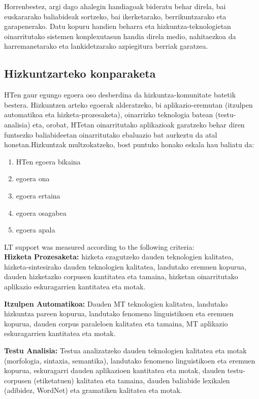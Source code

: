 \begin{multicols}{2}
Horrenbestez, argi dago ahalegin handiagoak bideratu behar direla, bai euskararako baliabideak sortzeko, bai ikerketarako, berrikuntzarako eta garapenerako. Datu kopuru handien beharra eta hizkuntza-teknologietan oinarritutako sistemen konplexutasun handia direla medio, nahitaezkoa da harremanetarako eta lankidetzarako azpiegitura berriak garatzea.

\subsection{Hizkuntzarteko konparaketa}
    HTen gaur egungo egoera oso desberdina da hizkuntza-komunitate batetik bestera. Hizkuntzen arteko egoerak alderatzeko, bi aplikazio-eremutan (itzulpen automatikoa eta hizketa-prozesaketa), oinarrizko teknologia batean (testu-analisia) eta, orobat, HTetan oinarritutako aplikazioak garatzeko behar diren funtsezko baliabideetan oinarritutako ebaluazio bat aurkeztu da atal honetan.Hizkuntzak multzokatzeko, bost puntuko honako eskala hau baliatu da:

\begin{enumerate}
\item HTen egoera bikaina
\item egoera ona
\item egoera ertaina
\item egoera osagabea
\item egoera apala
\end{enumerate}

LT support was measured according to the following criteria:\\
\textbf{Hizketa Prozesaketa:} hizketa ezagutzeko dauden teknologien kalitatea, hizketa-sintesirako dauden teknologien kalitatea, landutako eremuen kopurua, dauden hizketazko corpusen kantitatea eta tamaina, hizketan oinarritutako aplikazio eskuragarrien kantitatea eta motak.

\textbf{Itzulpen Automatikoa:} Dauden MT teknologien kalitatea, landutako hizkuntza pareen kopurua, landutako fenomeno linguistikoen eta eremuen kopurua, dauden corpus paraleloen kalitatea eta tamaina, MT aplikazio eskuragarrien kantitatea eta motak.

\textbf{Testu Analisia:} Testua analizatzeko dauden teknologien kalitatea eta motak (morfologia, sintaxia, semantika), landutako fenomeno linguistikoen eta eremuen kopurua, eskuragarri dauden aplikazioen kantitatea eta motak, dauden testu-corpusen (etiketatuen) kalitatea eta tamaina, dauden baliabide lexikalen (adibidez, WordNet) eta gramatiken kalitatea eta motak.


\end{multicols}
